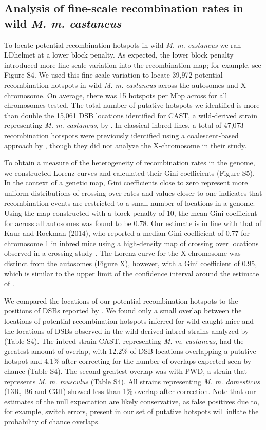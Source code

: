 \subsection{Analysis of fine-scale recombination rates in wild \emph{M. m. castaneus}}


To locate potential recombination hotspots in wild \textit{M. m. castaneus} we ran LDhelmet at a lower block penalty. As expected, the lower block penalty introduced more fine-scale variation into the recombination map; for example, see Figure S4. We used this fine-scale variation to locate 39,972 potential recombination hotspots in wild \textit{M. m. castaneus} across the autosomes and X-chromosome. On average, there was 15 hotspots per Mbp across for all chromosomes tested. The total number of putative hotspots we identified is more than double the 15,061 DSB locations identified for CAST, a wild-derived strain representing \textit{M. m. castaneus}, by \cite{RN249}. In classical inbred lines, a total of 47,073 recombination hotspots were previously identified using a coalescent-based approach by \cite{RN156}, though they did not analyze the X-chromosome in their study. 

To obtain a measure of the heterogeneity of recombination rates in the genome, we constructed Lorenz curves and calculated their Gini coefficients (Figure S5). In the context of a genetic map, Gini coefficients close to zero represent more uniform distributions of crossing-over rates and values closer to one indicates that recombination events are restricted to a small number of locations in a genome. Using the map constructed with a block penalty of 10, the mean Gini coefficient for across all autosomes was found to be 0.78. Our estimate is in line with that of Kaur and Rockman (2014), who reported a median Gini coefficient of 0.77 for chromosome 1 in inbred mice using a high-density map of crossing over locations observed in a crossing study \citep{RN263}. The Lorenz curve for the X-chromosome was distinct from the autosomes (Figure X), however, with a Gini coefficient of 0.95, which is similar to the upper limit of the confidence interval around the estimate of \cite{RN333}. 

We compared the locations of our potential recombination hotspots to the positions of DSBs reported by \cite{RN249}. We found only a small overlap between the locations of potential recombination hotspots inferred for wild-caught mice and the locations of DSBs observed in the wild-derived inbred strains analyzed by \cite{RN249} (Table S4). The inbred strain CAST, representing \textit{M. m. castaneus}, had the greatest amount of overlap, with 12.2\% of DSB locations overlapping a putative hotspot and 4.1\% after correcting for the number of overlaps expected seen by chance (Table S4). The second greatest overlap was with PWD, a strain that represents \emph{M. m. musculus} (Table S4). All strains representing \emph{M. m. domesticus} (13R, B6 and C3H) showed less than 1\% overlap after correction. Note that our estimates of the null expectation are likely conservative, as false positives due to, for example, switch errors, present in our set of putative hotspots will inflate the probability of chance overlaps. 

